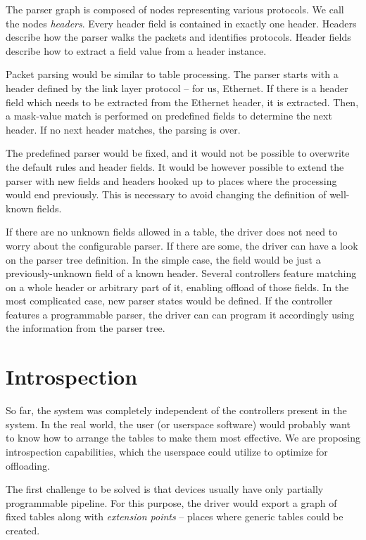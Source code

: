 The parser graph is composed of nodes representing various protocols. We
call the nodes \emph{headers}. Every header field is contained in exactly one header.
Headers describe how the parser walks the packets and identifies protocols.
Header fields describe how to extract a field value from a header instance.

Packet parsing would be similar to table processing. The parser
starts with a header defined by the link layer protocol -- for us, Ethernet. If there is
a header field which needs to be extracted from the Ethernet header, it is
extracted. Then, a mask-value match is performed on predefined fields to
determine the next header. If no next header matches, the parsing is over.

The predefined parser would be fixed, and it would not be possible to overwrite
the default rules and header fields. It would be however possible to extend the
parser with new fields and headers hooked up to places where the processing
would end previously. This is necessary to avoid changing the definition of
well-known fields.

If there are no unknown fields allowed in a table, the driver does not need to worry
about the configurable parser. If there are some, the driver can have a look
on the parser tree definition. In the simple case, the field would be just
a previously-unknown field of a known header. Several controllers feature
matching on a whole header or arbitrary part of it, enabling offload of those
fields. In the most complicated case, new parser states would be defined. If
the controller features a programmable parser, the driver can can program it
accordingly using the information from the parser tree.

\section{Introspection}

So far, the system was completely independent of the controllers present in the
system. In the real world, the user (or userspace software) would probably want
to know how to arrange the tables to make them most effective. We are proposing
introspection capabilities, which the userspace could utilize to optimize for
offloading.

The first challenge to be solved is that devices usually have only
partially programmable pipeline. For this purpose, the driver would export
a graph of fixed tables along with \emph{extension points} -- places where
generic tables could be created.


